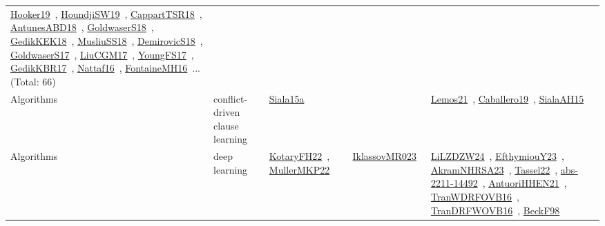 {\begin{longtable}{lp{3cm}>{\raggedright\arraybackslash}p{6cm}>{\raggedright\arraybackslash}p{6cm}>{\raggedright\arraybackslash}p{8cm}}
\href{../works/Hooker19.pdf}{Hooker19}~\cite{Hooker19}, \href{../works/HoundjiSW19.pdf}{HoundjiSW19}~\cite{HoundjiSW19}, \href{../works/CappartTSR18.pdf}{CappartTSR18}~\cite{CappartTSR18}, \href{../works/AntunesABD18.pdf}{AntunesABD18}~\cite{AntunesABD18}, \href{../works/GoldwaserS18.pdf}{GoldwaserS18}~\cite{GoldwaserS18}, \href{../works/GedikKEK18.pdf}{GedikKEK18}~\cite{GedikKEK18}, \href{../works/MusliuSS18.pdf}{MusliuSS18}~\cite{MusliuSS18}, \href{../works/DemirovicS18.pdf}{DemirovicS18}~\cite{DemirovicS18}, \href{../works/GoldwaserS17.pdf}{GoldwaserS17}~\cite{GoldwaserS17}, \href{../works/LiuCGM17.pdf}{LiuCGM17}~\cite{LiuCGM17}, \href{../works/YoungFS17.pdf}{YoungFS17}~\cite{YoungFS17}, \href{../works/GedikKBR17.pdf}{GedikKBR17}~\cite{GedikKBR17}, \href{../works/Nattaf16.pdf}{Nattaf16}~\cite{Nattaf16}, \href{../works/FontaineMH16.pdf}{FontaineMH16}~\cite{FontaineMH16}... (Total: 66)\\
\index{conflict-driven clause learning}\index{Algorithms!conflict-driven clause learning}Algorithms & conflict-driven clause learning & \href{../works/Siala15a.pdf}{Siala15a}~\cite{Siala15a} &  & \href{../works/Lemos21.pdf}{Lemos21}~\cite{Lemos21}, \href{../works/Caballero19.pdf}{Caballero19}~\cite{Caballero19}, \href{../works/SialaAH15.pdf}{SialaAH15}~\cite{SialaAH15}\\
\index{deep learning}\index{Algorithms!deep learning}Algorithms & deep learning & \href{../works/KotaryFH22.pdf}{KotaryFH22}~\cite{KotaryFH22}, \href{../works/MullerMKP22.pdf}{MullerMKP22}~\cite{MullerMKP22} & \href{../works/IklassovMR023.pdf}{IklassovMR023}~\cite{IklassovMR023} & \href{../works/LiLZDZW24.pdf}{LiLZDZW24}~\cite{LiLZDZW24}, \href{../works/EfthymiouY23.pdf}{EfthymiouY23}~\cite{EfthymiouY23}, \href{../works/AkramNHRSA23.pdf}{AkramNHRSA23}~\cite{AkramNHRSA23}, \href{../works/Tassel22.pdf}{Tassel22}~\cite{Tassel22}, \href{../works/abs-2211-14492.pdf}{abs-2211-14492}~\cite{abs-2211-14492}, \href{../works/AntuoriHHEN21.pdf}{AntuoriHHEN21}~\cite{AntuoriHHEN21}, \href{../works/TranWDRFOVB16.pdf}{TranWDRFOVB16}~\cite{TranWDRFOVB16}, \href{../works/TranDRFWOVB16.pdf}{TranDRFWOVB16}~\cite{TranDRFWOVB16}, \href{../works/BeckF98.pdf}{BeckF98}~\cite{BeckF98}\\

\end{longtable}}
